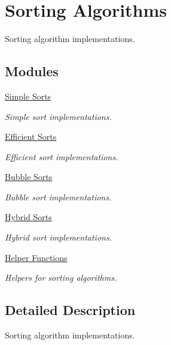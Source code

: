 \hypertarget{group__SortingAlgorithm}{}\section{Sorting Algorithms}
\label{group__SortingAlgorithm}


Sorting algorithm implementations.  


\subsection*{Modules}
\begin{DoxyCompactItemize}
\item 
\hyperlink{group__SimpleSort}{Simple Sorts}
\begin{DoxyCompactList}\small\item\em Simple sort implementations. \end{DoxyCompactList}\item 
\hyperlink{group__EfficientSort}{Efficient Sorts}
\begin{DoxyCompactList}\small\item\em Efficient sort implementations. \end{DoxyCompactList}\item 
\hyperlink{group__BubbleSort}{Bubble Sorts}
\begin{DoxyCompactList}\small\item\em Bubble sort implementations. \end{DoxyCompactList}\item 
\hyperlink{group__HybridSort}{Hybrid Sorts}
\begin{DoxyCompactList}\small\item\em Hybrid sort implementations. \end{DoxyCompactList}\item 
\hyperlink{group__SortingHelper}{Helper Functions}
\begin{DoxyCompactList}\small\item\em Helpers for sorting algorithms. \end{DoxyCompactList}\end{DoxyCompactItemize}


\subsection{Detailed Description}
Sorting algorithm implementations. 

